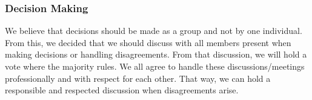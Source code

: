 \documentclass{article}
\begin{document}
\subsubsection*{Decision Making} 


We believe that decisions should be made as a group and not by one individual. From this, we decided that we should discuss with all members present when making decisions or handling disagreements. From that discussion, we will hold a vote where the majority rules. We all agree to handle these discussions/meetings professionally and with respect for each other. That way, we can hold a responsible and respected discussion when disagreements arise. 
\end{document}
